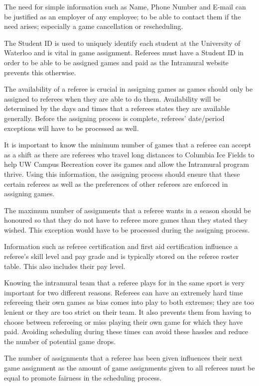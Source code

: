 \documentclass{article}
\begin{document}
The need for simple information such as Name, Phone Number and E-mail can be justified as an employer of any employee; to be able to contact them if the need arises; especially a game cancellation or rescheduling.

The Student ID is used to uniquely identify each student at the University of Waterloo and is vital in game assignment. Referees must have a Student ID in order to be able to be assigned games and paid as the Intramural website prevents this otherwise.

The availability of a referee is crucial in assigning games as games should only be assigned to referees when they are able to do them. Availability will be determined by the days and times that a referees states they are available generally. Before the assigning process is complete, referees' date/period exceptions will have to be processed as well.

It is important to know the minimum number of games that a referee can accept as a shift as there are referees who travel long distances to Columbia Ice Fields to help UW Campus Recreation cover its games and allow the Intramural program thrive. Using this information, the assigning process should ensure that these certain referees as well as the preferences of other referees are enforced in assigning games.

The maximum number of assignments that a referee wants in a season should be honoured so that they do not have to referee more games than they stated they wished. This exception would have to be processed during the assigning process.

Information such as referee certification and first aid certification influence a referee's skill level and pay grade and is typically stored on the referee roster table. This also includes their pay level.

Knowing the intramural team that a referee plays for in the same sport is very important for two different reasons. Referees can have an extremely hard time refereeing their own games as bias comes into play to both extremes; they are too lenient or they are too strict on their team. It also prevents them from having to choose between refereeing or miss playing their own game for which they have paid. Avoiding scheduling during these times can avoid these hassles and reduce the number of potential game drops.

The number of assignments that a referee has been given influences their next game assignment as the amount of game assignments given to all referees must be equal to promote fairness in the scheduling process.
\end{document}
